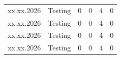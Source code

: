 \begin{landscape}
\begin{longtable}[c]{lp{10cm}rrrr}
		xx.xx.2026
		     & Testing
		     & 0                                                                                                                   %
		     & 0                                                                                                                   %
		     & 4                                                                                                                   %
		     & 0                                                                                                                   \\ %

		xx.xx.2026
		     & Testing
		     & 0                                                                                                                   %
		     & 0                                                                                                                   %
		     & 4                                                                                                                   %
		     & 0                                                                                                                   \\ %

		xx.xx.2026
		     & Testing
		     & 0                                                                                                                   %
		     & 0                                                                                                                   %
		     & 4                                                                                                                   %
		     & 0                                                                                                                   \\ %

		xx.xx.2026
		     & Testing
		     & 0                                                                                                                   %
		     & 0                                                                                                                   %
		     & 4                                                                                                                   %
		     & 0                                                                                                                   \\ %
	\end{longtable}

\end{landscape}